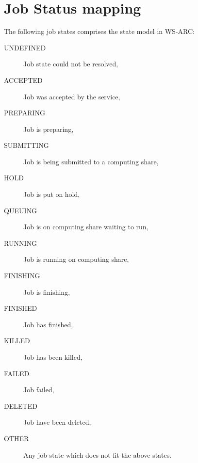 \documentclass{book}
\begin{document}
\chapter{Job Status mapping}
\label{app:broker-mapping}

The following job states comprises the state model in WS-ARC:
\begin{description}
\item[UNDEFINED] Job state could not be resolved,
\item[ACCEPTED] Job was accepted by the service,
\item[PREPARING] Job is preparing,
\item[SUBMITTING] Job is being submitted to a computing share,
\item[HOLD] Job is put on hold,
\item[QUEUING] Job is on computing share waiting to run,
\item[RUNNING] Job is running on computing share,
\item[FINISHING] Job is finishing,
\item[FINISHED] Job has finished,
\item[KILLED] Job has been killed,
\item[FAILED] Job failed,
\item[DELETED] Job have been deleted,
\item[OTHER] Any job state which does not fit the above states.
\end{description}
\end{document}
